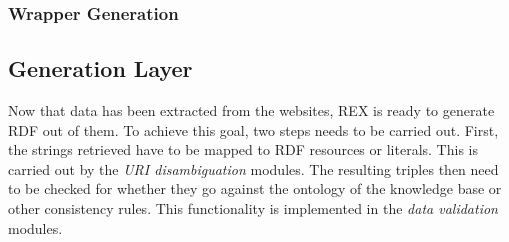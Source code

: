 \documentclass{llncs}
\begin{document}


\subsubsection{Wrapper Generation} %
\label{alfred}



\subsection{Generation Layer}
Now that data has been extracted from the websites, REX is ready to generate RDF out of them. 
To achieve this goal, two steps needs to be carried out. 
First, the strings retrieved have to be mapped to RDF resources or literals. 
This is carried out by the \emph{URI disambiguation} modules. 
The resulting triples then need to be checked for whether they go against the ontology of the knowledge base or other consistency rules. 
This functionality is implemented in the \emph{data validation} modules. 
\end{document}
